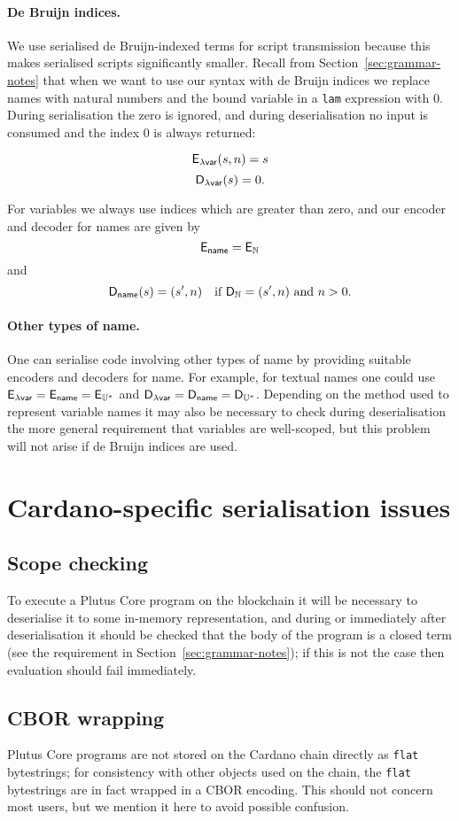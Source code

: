 \paragraph{De Bruijn indices.}
We use serialised de Bruijn-indexed terms for script transmission because
this makes serialised scripts significantly smaller.  Recall from
Section~\ref{sec:grammar-notes} that when we want to use our syntax with de
Bruijn indices we replace names with natural numbers and the bound variable in a
\texttt{lam} expression with 0.  During serialisation the zero is ignored, and
during deserialisation no input is consumed and the index 0 is always returned:

$$
\mathsf{E}_{\mathsf{\text{$\lambda$}var}}(s, n) = s
$$
$$
\mathsf{D}_{\mathsf{\text{$\lambda$}var}}(s) = 0.
$$

\noindent For variables we always use indices which are greater than zero, and our
encoder and decoder for names are given by
$$
\mathsf{E}_{\mathsf{name}} = \mathsf{E}_{\mathbb{N}}
$$
and
$$
\mathsf{D}_{\mathsf{name}} (s) = (s', n) \quad \text{if $\mathsf{D}_{\mathbb{N}} = (s', n)$ and $n>0$}.
$$


\paragraph{Other types of name.}
One can serialise code involving other types of name by providing suitable
encoders and decoders for name.  For example, for textual names one could use
$\mathsf{E}_{\mathsf{\text{$\lambda$}var}} = \mathsf{E}_{\mathsf{name}} = \mathsf{E}_{\mathbb{U}^*}$ and $\mathsf{D}_{\mathsf{\text{$\lambda$}var}} = \mathsf{D}_{\mathsf{name}} = \mathsf{D}_{\mathbb{U}^*}$.  Depending
on the method used to represent variable names it may also be necessary to check
during deserialisation the more general requirement that variables are
well-scoped, but this problem will not arise if de Bruijn indices are used.

\section{Cardano-specific serialisation issues}
\label{sec:cardano-issues}
\subsection{Scope checking}
To execute a Plutus Core program on the blockchain it will be necessary to
deserialise it to some in-memory representation, and during or immediately after
deserialisation it should be checked that the body of the program is a closed
term (see the requirement in Section~\ref{sec:grammar-notes}); if this is not
the case then evaluation should fail immediately.

\subsection{CBOR wrapping}
Plutus Core programs are not stored on the Cardano chain directly as
\texttt{flat} bytestrings; for consistency with other objects used on the chain,
the \texttt{flat} bytestrings are in fact wrapped in a CBOR encoding.  This
should not concern most users, but we mention it here to avoid possible
confusion.


